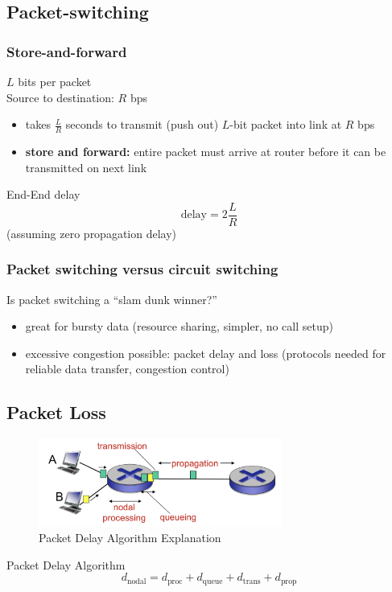 \subsection{Packet-switching}
\subsubsection{Store-and-forward}
\begin{leftbar}
	$L$ bits per packet\\
	Source to destination: $R$ bps
\end{leftbar}
\begin{itemize}
	\item takes $\frac{L}{R}$ seconds to transmit (push out) $L$-bit packet into link at $R$ bps
	\item \textbf{store and forward:} entire packet must arrive at router before it can be transmitted on next link
\end{itemize}
\begin{note}{End-End delay}
	\[
		\text{delay} = 2\frac{L}{R}
	\]
	(assuming zero propagation delay)
\end{note}
\subsubsection{Packet switching versus circuit switching}
Is packet switching a ``slam dunk winner?''
\begin{itemize}
	\item great for bursty data (resource sharing, simpler, no call setup)
	\item excessive congestion possible: packet delay and loss (protocols needed for reliable data transfer, congestion control)
\end{itemize}

\subsection{Packet Loss}
\begin{figure}[H]
	\includegraphics[width=8cm]{delay}
	\centering
	\caption{Packet Delay Algorithm Explanation}
\end{figure}
\begin{note}{Packet Delay Algorithm}
	\[ d_\text{nodal} = d_\text{proc} + d_\text{queue} + d_\text{trans} + d_\text{prop} \]
\end{note}
